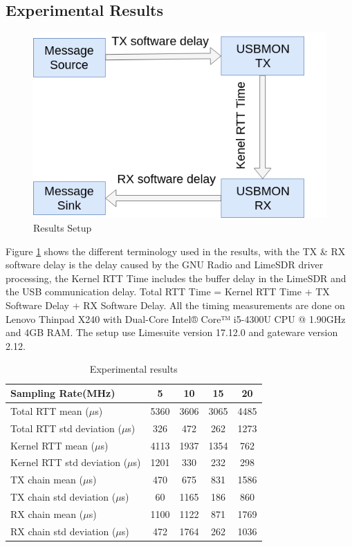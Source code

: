 \documentclass{kththesis}
\begin{document}
\subsection{Experimental Results}
\begin{figure}
\centering
\includegraphics[scale=0.5]{Figure/results_setup.png}
\caption{Results Setup}
\label{res_set}
\end{figure}
Figure \ref{res_set} shows the different terminology used in the results, with the TX \& RX software delay is the delay caused by the GNU Radio and LimeSDR driver processing, the Kernel RTT Time includes the buffer delay in the LimeSDR and the USB communication delay. Total RTT Time = Kernel RTT Time + TX Software Delay + RX Software Delay. All the timing measurements are done on Lenovo Thinpad X240 with Dual-Core Intel® Core™ i5-4300U CPU @ 1.90GHz and 4GB RAM. The setup use Limesuite version 17.12.0 and gateware version 2.12.
\begin{table}
\centering
\label{res}
\begin{tabular}{|l|c|c|c|c|}
\hline
Sampling Rate(MHz)                                                  & 5    & 10   & 15   & 20   \\
\hline
Total RTT mean ($\mu$s)                                                      & 5360 & 3606 & 3065 & 4485 \\ \hline
Total RTT std deviation ($\mu$s)   & 326  & 472  & 262  & 1273 \\ \hline
Kernel RTT mean ($\mu$s)                                                     & 4113 & 1937 & 1354 & 762  \\ \hline
Kernel RTT std deviation ($\mu$s) & 1201 & 330  & 232  & 298  \\ \hline
TX chain mean ($\mu$s)                                                       & 470  & 675  & 831  & 1586 \\ \hline
TX chain std deviation ($\mu$s)    & 60   & 1165 & 186  & 860  \\ \hline
RX chain mean ($\mu$s)                                                       & 1100 & 1122 & 871  & 1769 \\ \hline
RX chain std deviation ($\mu$s)                                              & 472  & 1764 & 262  & 1036\\ \hline
\end{tabular}
\caption{Experimental results}
\end{table}
\end{document}
